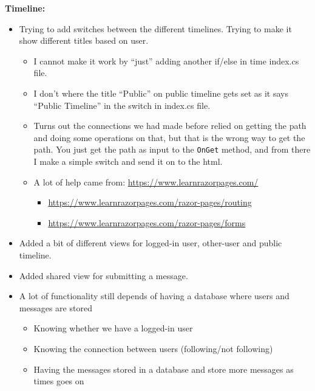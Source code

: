 \textbf{Timeline:}

\begin{itemize}
    \item Trying to add switches between the different timelines. Trying to make it show different titles based on user.

    \begin{itemize}
        \item I cannot make it work by ``just'' adding another if/else in time index.cs file.
        \item I don't where the title ``Public'' on public timeline gets set as it says ``Public Timeline'' in the switch in index.cs file.
        \item Turns out the connections we had made before relied on getting the path and doing some operations on that, but that is the wrong way to get the path. You just get the path as input to the \texttt{OnGet} method, and from there I make a simple switch and send it on to the html.
        \item A lot of help came from: \url{https://www.learnrazorpages.com/}

        \begin{itemize}
            \item \url{https://www.learnrazorpages.com/razor-pages/routing}
            \item \url{https://www.learnrazorpages.com/razor-pages/forms}
        \end{itemize}
    \end{itemize}

    \item Added a bit of different views for logged-in user, other-user and public timeline.
    \item Added shared view for submitting a message.
    \item A lot of functionality still depends of having a database where users and messages are stored

    \begin{itemize}
        \item Knowing whether we have a logged-in user
        \item Knowing the connection between users (following/not following)
        \item Having the messages stored in a database and store more messages as times goes on
    \end{itemize}
\end{itemize}

